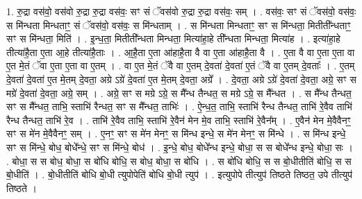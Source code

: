 \documentclass[17pt]{extarticle}
\begin{document}
1. रु॒द्रा वस॑वो॒ वस॑वो रु॒द्रा रु॒द्रा वस॑वः॒ सꣳ सं ॅवस॑वो रु॒द्रा रु॒द्रा वस॑वः॒ सम् । . वस॑वः॒ सꣳ सं ॅवस॑वो॒ वस॑वः॒ स मि॑न्धता मिन्धताꣳ॒॒ सं ॅवस॑वो॒ वस॑वः॒ स मि॑न्धताम् । . स मि॑न्धता मिन्धताꣳ॒॒ सꣳ स मि॑न्धता॒ मितीती᳚न्धताꣳ॒॒ सꣳ स मि॑न्धता॒ मिति॑ । . इ॒न्ध॒ता॒ मितीती᳚न्धता मिन्धता॒ मित्या॑हा॒हे ती᳚न्धता मिन्धता॒ मित्या॑ह । . इत्या॑हा॒हे तीत्या॑है॒ता ए॒ता आ॒हे तीत्या॑है॒ताः । . आ॒है॒ता ए॒ता आ॑हाहै॒ता वै वा ए॒ता आ॑हाहै॒ता वै । . ए॒ता वै वा ए॒ता ए॒ता वा ए॒त मे॒तं ॅवा ए॒ता ए॒ता वा ए॒तम् । . वा ए॒त मे॒तं ॅवै वा ए॒तम् दे॒वता॑ दे॒वता॑ ए॒तं ॅवै वा ए॒तम् दे॒वताः᳚ । . ए॒तम् दे॒वता॑ दे॒वता॑ ए॒त मे॒तम् दे॒वता॒ अग्रे ऽग्रे॑ दे॒वता॑ ए॒त मे॒तम् दे॒वता॒ अग्रे᳚ । . दे॒वता॒ अग्रे ऽग्रे॑ दे॒वता॑ दे॒वता॒ अग्रे॒ सꣳ स मग्रे॑ दे॒वता॑ दे॒वता॒ अग्रे॒ सम् । . अग्रे॒ सꣳ स मग्रे ऽग्रे॒ स मै᳚न्ध तैन्धत॒ स मग्रे ऽग्रे॒ स मै᳚न्धत । . स मै᳚न्ध तैन्धत॒ सꣳ स मै᳚न्धत॒ ताभि॒ स्ताभि॑ रैन्धत॒ सꣳ स मै᳚न्धत॒ ताभिः॑ । . ऐ॒न्ध॒त॒ ताभि॒ स्ताभि॑ रैन्ध तैन्धत॒ ताभि॑ रे॒वैव ताभि॑ रैन्ध तैन्धत॒ ताभि॑ रे॒व । . ताभि॑ रे॒वैव ताभि॒ स्ताभि॑ रे॒वैन॑ मेन मे॒व ताभि॒ स्ताभि॑ रे॒वैन᳚म् । . ए॒वैन॑ मेन मे॒वैवैनꣳ॒॒ सꣳ स मे॑न मे॒वैवैनꣳ॒॒ सम् । . ए॒नꣳ॒॒ सꣳ स मे॑न मेनꣳ॒॒ स मि॑न्ध इन्धे॒ स मे॑न मेनꣳ॒॒ स मि॑न्धे । . स मि॑न्ध इन्धे॒ सꣳ स मि॑न्धे॒ बोध॒ बोधे᳚न्धे॒ सꣳ स मि॑न्धे॒ बोध॑ । . इ॒न्धे॒ बोध॒ बोधे᳚न्ध इन्धे॒ बोधा॒ स स बोधे᳚न्ध इन्धे॒ बोधा॒ सः । . बोधा॒ स स बोध॒ बोधा॒ स बो॑धि बोधि॒ स बोध॒ बोधा॒ स बो॑धि । . स बो॑धि बोधि॒ स स बो॒धीतीति॑ बोधि॒ स स बो॒धीति॑ । . बो॒धीतीति॑ बोधि बो॒धी त्युपोपेति॑ बोधि बो॒धी त्युप॑ । . इत्युपोपे तीत्युप॑ तिष्ठते तिष्ठत॒ उपे तीत्युप॑ तिष्ठते । \newline
\end{document}

